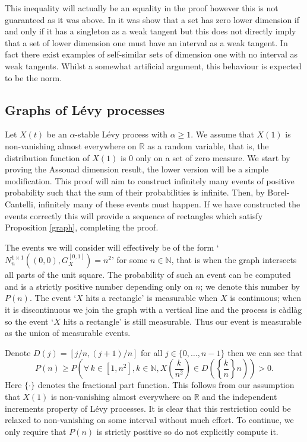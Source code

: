 This inequality will actually be an equality in the proof however this is not guaranteed as it was above. In \cite{microsets} it was show that a set has zero lower dimension if and only if it has a singleton as a weak tangent but this does not directly imply that a set of lower dimension one must have an interval as a weak tangent. In fact there exist examples of self-similar sets of dimension one with no interval as weak tangents. Whilst a somewhat artificial argument, this behaviour is expected to be the norm.


\subsection{Graphs of L\'evy processes}\label{LP}

Let $X(t)$ be an $\alpha$-stable L\'evy process with $\alpha \ge 1$. We assume that $X(1)$ is non-vanishing almost everywhere on $\mathbb{R}$ as a random variable, that is, the distribution function of $X(1)$ is 0 only on a set of zero measure. We start by proving the Assouad dimension result, the lower version will be a simple modification. This proof will aim to construct infinitely many events of positive probability such that the sum of their probabilities is infinite. Then, by Borel-Cantelli, infinitely many of these events must happen. If we have constructed the events correctly this will provide a sequence of rectangles which satisfy Proposition \ref{graph}, completing the proof.

The events we will consider will effectively be of the form `$N_{n}^{1 \times 1 }((0,0),G_X^{[0,1]})=n^2$' for some $n\in \mathbb{N}$, that is when the graph intersects all parts of the unit square. The probability of such an event can be computed and is a strictly positive number depending only on $n$; we denote this number by $P(n)$. The event `$X$ hits a rectangle' is measurable when $X$ is continuous; when it is discontinuous we join the graph with a vertical line and the process is c\`adl\`ag so the event `$X$ hits a rectangle' is still measurable. Thus our event is measurable as the union of measurable events. 

Denote $D(j)=[j/n,(j+1)/n]$ for all $j\in\{0,\dots, n-1\}$ then we can see that
\[
P(n)\geq P\left(\forall \, k\in\left[1,n^2\right], k\in \mathbb{N},X\left(\frac{k}{n^2}\right)\in D\left(\left\{\frac{k}{n}\right\}n\right)\right)>0.
\]
Here $\{ \cdot \}$ denotes the fractional part function. This follows from our assumption that $X(1)$ is non-vanishing almost everywhere on $\mathbb{R}$ and the independent increments property of L\'evy processes. It is clear that this restriction could be relaxed to non-vanishing on some interval without much effort. To continue, we only require that $P(n)$ is strictly positive so do not explicitly compute it.


